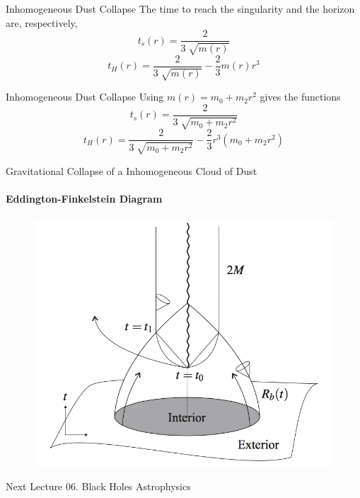 \documentclass{beamer}
\begin{document}
\begin{darkframes}
\begin{frame}{Inhomogeneous Dust Collapse}
	The time to reach the singularity and the horizon are, respectively,
    \pause
    $$t_s (r) = \frac{2}{3\sqrt[]{m(r)}}$$
    \pause
    $$t_H (r) = \frac{2}{3\sqrt[]{m(r)}} - \frac{2}{3} m(r) r^3$$
\end{frame}

\begin{frame}{Inhomogeneous Dust Collapse}
	Using $m(r) = m_0 + m_2 r^2$ gives the functions
	$$t_s (r) = \frac{2}{3\sqrt[]{m_0 + m_2 r^2}}$$
    $$t_H (r) = \frac{2}{3\sqrt[]{m_0 + m_2 r^2}} - \frac{2}{3} r^3 \left(m_0 + m_2 r^2 \right)$$
\end{frame}

\end{darkframes}

\begin{frame}{Gravitational Collapse of a Inhomogeneous Cloud of Dust}
\framesubtitle{Eddington-Finkelstein Diagram}
	\begin{center}
      \begin{figure}
      	\includegraphics[scale=0.25] {figures/EFCollapseInhomogeneous.jpeg}
      \end{figure}
	\end{center}	
\end{frame}

\begin{darkframes}

  		\begin{frame}{Next Lecture}
        	\Large
			{06. Black Holes Astrophysics}
		\end{frame}
  
  \end{darkframes}
\end{document}
